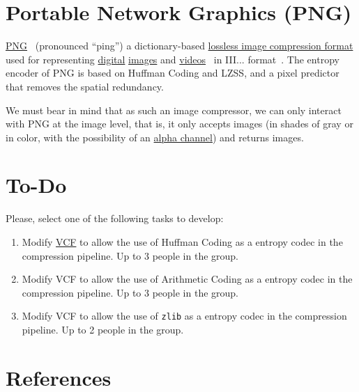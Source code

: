 \section{Portable Network Graphics (PNG)}

\href{https://en.wikipedia.org/wiki/Portable_Network_Graphics}{PNG}~\cite{vruiz__PNG}
(pronounced ``ping'') a dictionary-based
\href{https://en.wikipedia.org/wiki/Lossless_compression}{lossless
  image compression format} used for representing
\href{https://en.wikipedia.org/wiki/Digital_data}{digital}
\href{https://en.wikipedia.org/wiki/Digital_image}{images} and
\href{https://en.wikipedia.org/wiki/Video}{videos}~\cite{vruiz__image_video}
in III... format~\cite{vruiz__video_compression}. The entropy encoder
of PNG is based on Huffman Coding and LZSS, and a pixel predictor that
removes the spatial redundancy.

We must bear in mind that as such an image compressor, we can only
interact with PNG at the image level, that is, it only accepts images
(in shades of gray or in color, with the possibility of an
\href{https://en.wikipedia.org/wiki/Alpha_compositing}{alpha channel})
and returns images.



\section{To-Do}
Please, select one of the following tasks to develop:
\begin{enumerate}
\item Modify \href{https://github.com/Sistemas-Multimedia/VCF}{VCF} to
  allow the use of Huffman Coding as a entropy codec in the
  compression pipeline. Up to 3 people in the group.
\item Modify VCF to allow the use of Arithmetic Coding as a entropy
  codec in the compression pipeline. Up to 3 people in the group.
\item Modify VCF to allow the use of \texttt{zlib} as a entropy codec
  in the compression pipeline. Up to 2 people in the group.
\end{enumerate}

\section{References}

\renewcommand{\addcontentsline}[3]{}%

